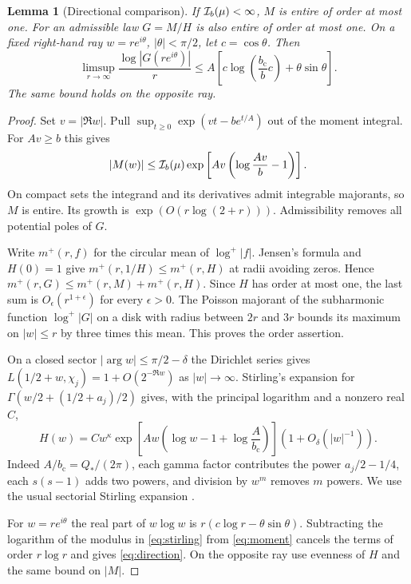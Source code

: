 \documentclass[11pt,letterpaper]{article}
\newtheorem{lemma}[theorem]{Lemma}
\newcommand{\bcrit}{b_{\mathrm c}}
\begin{document}
\begin{lemma}[Directional comparison]\label{lem:stirling}
If $\mathcal I_b(\mu)<\infty$, $M$ is entire of order at most one. For an admissible law $G=M/H$ is also entire of order at most one. On a fixed right-hand ray $w=r e^{i\theta}$, $|\theta|<\pi/2$, let $c=\cos\theta$. Then
\begin{equation}
 \limsup_{r\to\infty}\frac{\log|G(re^{i\theta})|}{r}
 \le A\left[c\log\!\left(\frac{\bcrit}{b}c\right)+\theta\sin\theta\right].
 \label{eq:direction}
\end{equation}
The same bound holds on the opposite ray.
\end{lemma}
\begin{proof}
Set $v=|\Re w|$. Pull $\sup_{t\ge0}\exp(vt-b e^{t/A})$ out of the moment integral. For $Av\ge b$ this gives
\begin{equation}
 |M(w)|\le\mathcal I_b(\mu)\exp\left[Av\left(\log\frac{Av}{b}-1\right)\right].
 \label{eq:moment}
\end{equation}
On compact sets the integrand and its derivatives admit integrable majorants, so $M$ is entire. Its growth is $\exp(O(r\log(2+r)))$. Admissibility removes all potential poles of $G$.

Write $m^+(r,f)$ for the circular mean of $\log^+|f|$. Jensen's formula and $H(0)=1$ give $m^+(r,1/H)\le m^+(r,H)$ at radii avoiding zeros. Hence $m^+(r,G)\le m^+(r,M)+m^+(r,H)$. Since $H$ has order at most one, the last sum is $O_\epsilon(r^{1+\epsilon})$ for every $\epsilon>0$. The Poisson majorant of the subharmonic function $\log^+|G|$ on a disk with radius between $2r$ and $3r$ bounds its maximum on $|w|\le r$ by three times this mean. This proves the order assertion.

On a closed sector $|\arg w|\le\pi/2-\delta$ the Dirichlet series gives $L(1/2+w,\chi_j)=1+O(2^{-\Re w})$ as $|w|\to\infty$. Stirling's expansion for $\Gamma(w/2+(1/2+a_j)/2)$ gives, with the principal logarithm and a nonzero real $C$,
\begin{equation}
 H(w)=C w^\kappa\exp\left[Aw\left(\log w-1+\log\frac{A}{\bcrit}\right)\right]
       (1+O_\delta(|w|^{-1})).
 \label{eq:stirling}
\end{equation}
Indeed $A/\bcrit=Q_* /(2\pi)$, each gamma factor contributes the power $a_j/2-1/4$, each $s(s-1)$ adds two powers, and division by $w^m$ removes $m$ powers. We use the usual sectorial Stirling expansion \cite{gamma}.

For $w=r e^{i\theta}$ the real part of $w\log w$ is $r(c\log r-\theta\sin\theta)$. Subtracting the logarithm of the modulus in \eqref{eq:stirling} from \eqref{eq:moment} cancels the terms of order $r\log r$ and gives \eqref{eq:direction}. On the opposite ray use evenness of $H$ and the same bound on $|M|$.
\end{proof}
\end{document}
